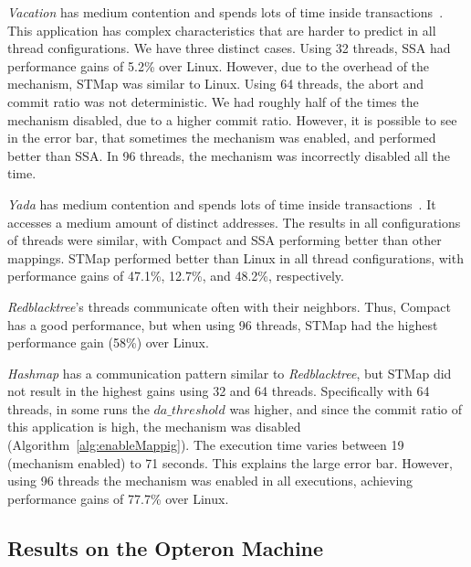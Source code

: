 
\emph{Vacation} has medium contention and spends lots of time inside transactions~\cite{STAMP}. This application has complex characteristics that are harder to predict in all thread configurations. We have three distinct cases. Using 32 threads, SSA had performance gains of 5.2\% over Linux. However, due to the overhead of the mechanism, STMap was similar to Linux. Using 64 threads, the abort and commit ratio was not deterministic. We had roughly half of the times the mechanism disabled, due to a higher commit ratio. However, it is possible to see in the error bar, that sometimes the mechanism was enabled, and performed better than SSA. In 96 threads, the mechanism was incorrectly disabled all the time.

\emph{Yada} has medium contention and spends lots of time inside transactions~\cite{STAMP}. It accesses a medium amount of distinct addresses. The results in all configurations of threads were similar, with Compact and SSA performing better than other mappings. STMap performed better than Linux in all thread configurations, with performance gains of 47.1\%, 12.7\%, and 48.2\%, respectively.

\emph{Redblacktree}'s threads communicate often with their neighbors. Thus, Compact has a good performance, but when using 96 threads, STMap had the highest performance gain (58\%) over Linux.

\emph{Hashmap} has a communication pattern similar to \emph{Redblacktree}, but STMap did not result in the highest gains using 32 and 64 threads. Specifically with 64 threads, in some runs the $da\_threshold$ was higher, and since the commit ratio of this application is high, the mechanism was disabled (Algorithm~\ref{alg:enableMappig}). The execution time varies between 19 (mechanism enabled) to 71 seconds. This explains the large error bar. However, using 96 threads the mechanism was enabled in all executions, achieving performance gains of 77.7\% over Linux. %

\subsection{Results on the Opteron Machine}

